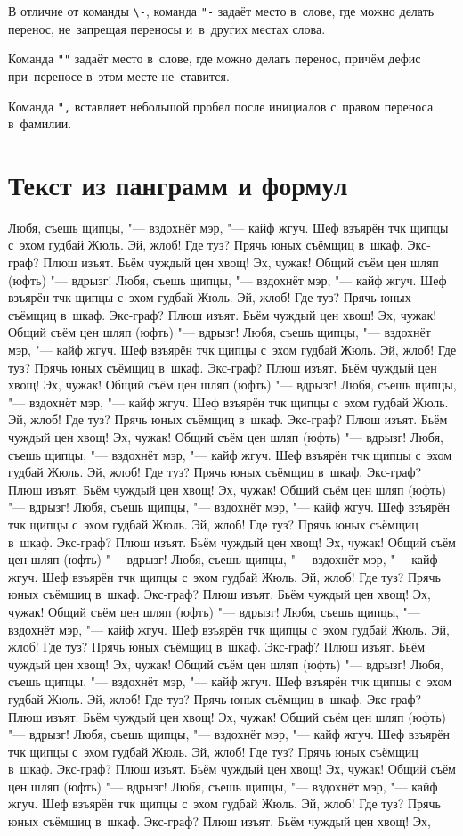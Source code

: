 В отличие от команды \verb|\-|, команда \verb|"-| задаёт место в~слове, где можно делать перенос, не~запрещая переносы и~в~других местах слова.

Команда \verb|""| задаёт место в~слове, где можно делать перенос, причём дефис при~переносе в~этом месте не~ставится.

Команда \verb|",| вставляет небольшой пробел после инициалов с~правом переноса в~фамилии.

\section{Текст из панграмм и формул}

Любя, съешь щипцы, "--- вздохнёт мэр, "--- кайф жгуч. Шеф взъярён тчк щипцы с~эхом гудбай Жюль. Эй, жлоб! Где туз? Прячь юных съёмщиц в~шкаф. Экс-граф? Плюш изъят. Бьём чуждый цен хвощ! Эх, чужак! Общий съём цен шляп (юфть) "--- вдрызг! Любя, съешь щипцы, "--- вздохнёт мэр, "--- кайф жгуч. Шеф взъярён тчк щипцы с~эхом гудбай Жюль. Эй, жлоб! Где туз? Прячь юных съёмщиц в~шкаф. Экс-граф? Плюш изъят. Бьём чуждый цен хвощ! Эх, чужак! Общий съём цен шляп (юфть) "--- вдрызг! Любя, съешь щипцы, "--- вздохнёт мэр, "--- кайф жгуч. Шеф взъярён тчк щипцы с~эхом гудбай Жюль. Эй, жлоб! Где туз? Прячь юных съёмщиц в~шкаф. Экс-граф? Плюш изъят. Бьём чуждый цен хвощ! Эх, чужак! Общий съём цен шляп (юфть) "--- вдрызг! Любя, съешь щипцы, "--- вздохнёт мэр, "--- кайф жгуч. Шеф взъярён тчк щипцы с~эхом гудбай Жюль. Эй, жлоб! Где туз? Прячь юных съёмщиц в~шкаф. Экс-граф? Плюш изъят. Бьём чуждый цен хвощ! Эх, чужак! Общий съём цен шляп (юфть) "--- вдрызг! Любя, съешь щипцы, "--- вздохнёт мэр, "--- кайф жгуч. Шеф взъярён тчк щипцы с~эхом гудбай Жюль. Эй, жлоб! Где туз? Прячь юных съёмщиц в~шкаф. Экс-граф? Плюш изъят. Бьём чуждый цен хвощ! Эх, чужак! Общий съём цен шляп (юфть) "--- вдрызг! Любя, съешь щипцы, "--- вздохнёт мэр, "--- кайф жгуч. Шеф взъярён тчк щипцы с~эхом гудбай Жюль. Эй, жлоб! Где туз? Прячь юных съёмщиц в~шкаф. Экс-граф? Плюш изъят. Бьём чуждый цен хвощ! Эх, чужак! Общий съём цен шляп (юфть) "--- вдрызг! Любя, съешь щипцы, "--- вздохнёт мэр, "--- кайф жгуч. Шеф взъярён тчк щипцы с~эхом гудбай Жюль. Эй, жлоб! Где туз? Прячь юных съёмщиц в~шкаф. Экс-граф? Плюш изъят. Бьём чуждый цен хвощ! Эх, чужак! Общий съём цен шляп (юфть) "--- вдрызг! Любя, съешь щипцы, "--- вздохнёт мэр, "--- кайф жгуч. Шеф взъярён тчк щипцы с~эхом гудбай Жюль. Эй, жлоб! Где туз? Прячь юных съёмщиц в~шкаф. Экс-граф? Плюш изъят. Бьём чуждый цен хвощ! Эх, чужак! Общий съём цен шляп (юфть) "--- вдрызг! Любя, съешь щипцы, "--- вздохнёт мэр, "--- кайф жгуч. Шеф взъярён тчк щипцы с~эхом гудбай Жюль. Эй, жлоб! Где туз? Прячь юных съёмщиц в~шкаф. Экс-граф? Плюш изъят. Бьём чуждый цен хвощ! Эх, чужак! Общий съём цен шляп (юфть) "--- вдрызг! Любя, съешь щипцы, "--- вздохнёт мэр, "--- кайф жгуч. Шеф взъярён тчк щипцы с~эхом гудбай Жюль. Эй, жлоб! Где туз? Прячь юных съёмщиц в~шкаф. Экс-граф? Плюш изъят. Бьём чуждый цен хвощ! Эх, чужак! Общий съём цен шляп (юфть) "--- вдрызг! Любя, съешь щипцы, "--- вздохнёт мэр, "--- кайф жгуч. Шеф взъярён тчк щипцы с~эхом гудбай Жюль. Эй, жлоб! Где туз? Прячь юных съёмщиц в~шкаф. Экс-граф? Плюш изъят. Бьём чуждый цен хвощ! Эх, 